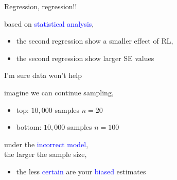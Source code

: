 %
%
\begin{lhframe}[rhgraphic={\texttt{[image: fork4\_reg.png]}}]
	{Regression, regression!!}
	
	based on \textcolor{blue}{statistical analysis},
	\begin{itemize}
		\item the second regression show a smaller effect of RL,
		\item the second regression show larger SE values
	\end{itemize}
\end{lhframe}
%
%
\begin{lhframe}[rhgraphic={\texttt{[image: fork4\_samplesize.pdf]}}]
	{I'm sure data won't help}
	
	imagine we can continue sampling,
	\begin{itemize}
		\item top: $10,000$ samples $n=20$
		\item bottom: $10,000$ samples $n=100$
	\end{itemize}
	
	under the \textcolor{blue}{incorrect model}, \\
	the larger the sample size,
	\begin{itemize}
		\item the less \textcolor{blue}{certain} are your \textcolor{blue}{biased} estimates
	\end{itemize}
\end{lhframe}
%
%
